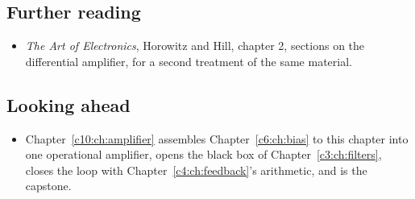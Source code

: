 \subsection*{Further reading}
\begin{itemize}
  \item \emph{The Art of Electronics}, Horowitz and Hill, chapter 2, sections on the differential amplifier, for a second treatment of the same material.
\end{itemize}

\subsection*{Looking ahead}
\begin{itemize}
  \item Chapter~\ref{c10:ch:amplifier} assembles Chapter~\ref{c6:ch:bias} to this chapter into one operational amplifier, opens the black box of Chapter~\ref{c3:ch:filters}, closes the loop with Chapter~\ref{c4:ch:feedback}'s arithmetic, and is the capstone.
\end{itemize}
